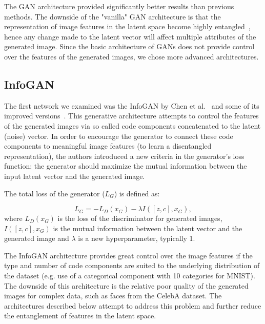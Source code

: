 \documentclass{egpubl}
\begin{document}
The GAN architecture provided significantly %
better results than %
previous methods. The downside of the "vanilla" GAN architecture is that the representation of image features in the latent space become highly entangled~\cite{radford2015unsupervised}, hence any change made to the latent vector will affect %
multiple attributes of the generated image. Since %
the basic architecture of GANs does not provide control over the features of the generated images, %
we chose %
more advanced architectures.


\subsection{InfoGAN}

The first network we examined was the InfoGAN by Chen et al.~\cite{chen2016infogan} and some of its improved versions~\cite{10.1007/978-3-319-78452-6_5,mirza2014conditional}. This generative architecture attempts to control the features of the generated images via so called code components concatenated to the latent (noise) vector. In order to encourage the generator to connect these code components to meaningful image features (to learn a disentangled representation), %
the authors introduced a new criteria in the generator's loss function: the generator should maximize the mutual information between the input latent vector and the generated image.

The total loss of the generator ($L_G$) is defined as:

\begin{equation}\label{g_loss}
L_G = -L_D(x_G) - \lambda I([z,c], x_G), %
\end{equation}
where $L_D(x_G)$ is the loss of the discriminator for generated images, $I([z,c], x_G)$ is the mutual information between the latent vector and the generated image and %
$\lambda$ is a new hyperparameter, typically 1.

The InfoGAN architecture provides great control over the image features if the type and number of code components are suited to the underlying distribution of the dataset (e.g. use of a categorical component with 10 categories for MNIST). The downside of this architecture is the relative poor quality of the generated images for complex data, %
such as faces from the CelebA dataset. The architectures described below attempt %
to address this problem and %
further reduce %
the entanglement of features in the latent space.
\end{document}
